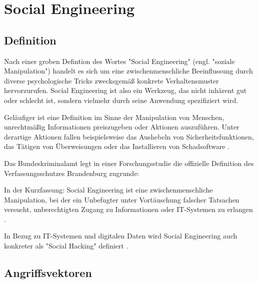 \chapter{Social Engineering}
\label{chapter:se}

\section{Definition}

Nach einer groben Defintion des Wortes "Social Engineering" (engl. "soziale Manipulation")
handelt es sich um eine zwischenmenschliche Beeinflussung durch diverse psychologische
Tricks zwecksgemäß konkrete Verhaltensmuster hervorzurufen.
Social Engineering ist also ein Werkzeug, das nicht inhärent gut oder schlecht ist, sondern vielmehr durch seine Anwendung spezifiziert wird.


Geläufiger ist eine Definition im Sinne der Manipulation von Menschen, unrechtmäßig Informationen preiszugeben oder Aktionen auszuführen.
Unter derartige Aktionen fallen beispielsweise das Aushebeln von Sicherheitsfunktionen, das Tätigen von Überweisungen oder
das Installieren von Schadsoftware .

Das Bundeskriminalamt legt in einer Forschungsstudie die offizielle Definition des Verfassungsschutzes Brandenburg
zugrunde: 

In der Kurzfassung: Social Engineering ist eine zwischenmenschliche Manipulation,
bei der ein Unbefugter unter Vortäuschung falscher Tatsachen versucht, unberechtigten Zugang zu Informationen oder IT-Systemen zu erlangen .

In Bezug zu IT-Systemen und digitalen Daten wird Social Engineering auch konkreter als "Social Hacking" definiert .

\section{Angriffsvektoren}

